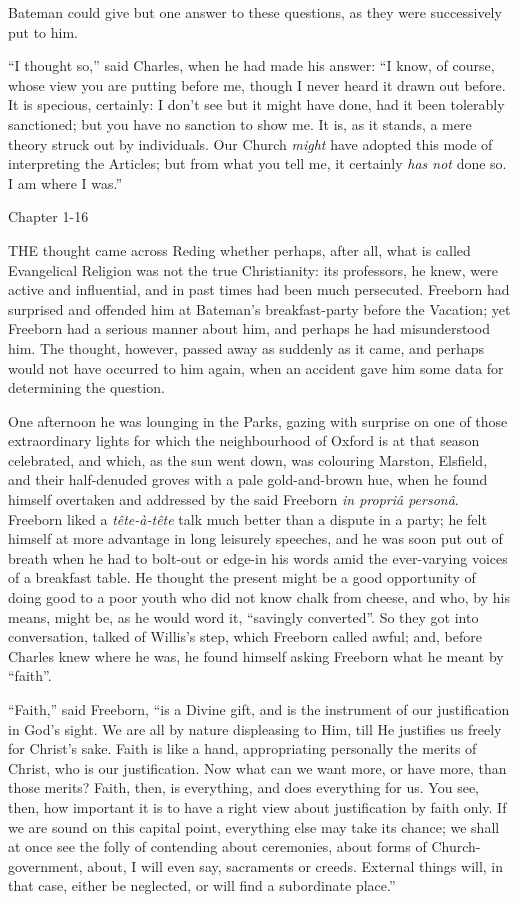 Bateman could give but one answer to these questions, as they were
successively put to him.

``I thought so,'' said Charles, when he had made his
answer: ``I know, of course, whose view you are putting before me,
though I never heard it drawn out before. It is specious, certainly: I
don't see but it might have done, had it been tolerably sanctioned;
but you have no sanction to show me. It is, as it stands, a mere
theory struck out by individuals. Our Church \emph{might} have adopted this
mode of interpreting the Articles; but from what you tell me, it
certainly \emph{has not} done so. I am where I was.''

Chapter 1-16


THE thought came across Reding whether
perhaps, after all, what is called Evangelical Religion was not the
true Christianity: its professors, he knew, were active and
influential, and in past times had been much persecuted. Freeborn had
surprised and offended him at Bateman's breakfast-party before the
Vacation; yet Freeborn had a serious manner about him, and perhaps he
had misunderstood him. The thought, however, passed away as suddenly
as it came, and perhaps would not have occurred to him again, when an
accident gave him some data for determining the question.

One afternoon he was lounging in the Parks, gazing with surprise on
one of those extraordinary lights for which the neighbourhood of
Oxford is at that season celebrated, and which, as the sun went down,
was colouring Marston, Elsfield, and their half-denuded groves with a
pale gold-and-brown hue, when he found himself overtaken and addressed
by the said Freeborn \emph{in propriâ personâ}. Freeborn liked a \emph{tête-à-tête}
talk much better than a dispute in a party; he felt himself at more
advantage in long leisurely speeches, and he was soon put out of
breath when he had to bolt-out or edge-in his words amid the
ever-varying voices of a breakfast table. He thought the present might
be a good opportunity of doing good to a poor youth who did not know
chalk from cheese, and who, by his means, might be, as he would word
it, ``savingly converted''. So they got into conversation,
talked of Willis's step, which Freeborn called awful; and, before
Charles knew where he was, he found himself asking Freeborn what he
meant by ``faith''.

``Faith,'' said Freeborn, ``is a Divine gift, and is
the instrument of our justification in God's sight. We are all by
nature displeasing to Him, till He justifies us freely for Christ's
sake. Faith is like a hand, appropriating personally the merits of
Christ, who is our justification. Now what can we want more, or have
more, than those merits? Faith, then, is everything, and does
everything for us. You see, then, how important it is to have a right
view about justification by faith only. If we are sound on this
capital point, everything else may take its chance; we shall at once
see the folly of contending about ceremonies, about forms of
Church-government, about, I will even say, sacraments or creeds.
External things will, in that case, either be neglected, or will find
a subordinate place.''

